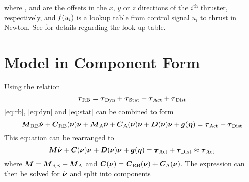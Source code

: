 where ,  and  are the offsets in the $x$, $y$ or $z$ directions of the $i^\text{th}$ thruster, respectively, and $\mathit{f}(u_{i})$ is a lookup table from control signal $u_i$ to thrust in Newton. See  for details regarding the look-up table.

\section{Model in Component Form}
Using the relation
\begin{equation}
\boldsymbol{\tau}_{\text{RB}} = \boldsymbol{\tau}_{\text{Dyn}} + \boldsymbol{\tau}_{\text{Stat}} + \boldsymbol{\tau}_{\text{Act}} + \boldsymbol{\tau}_{\text{Dist}}
\end{equation} \eqref{eq:rb}, \eqref{eq:dyn} and \eqref{eq:stat} can be combined to form
\begin{equation}
\boldsymbol{M}_{\text{RB}}\dot{\boldsymbol{\nu}} + \boldsymbol{C}_{\text{RB}}(\boldsymbol{\nu})\boldsymbol{\nu} + \boldsymbol{M}_{\text{A}} \dot{\boldsymbol{\nu}} +\boldsymbol{C}_{\text{A}}(\boldsymbol{\nu})\boldsymbol{\nu} + \boldsymbol{D}(\boldsymbol{\nu})\boldsymbol{\nu} + \boldsymbol{g}(\boldsymbol{\eta}) = \boldsymbol{\tau}_\text{{Act}} + \boldsymbol{\tau}_{\text{Dist}}
\end{equation}
This equation can be rearranged to
\begin{equation}
\boldsymbol{M} \dot{\boldsymbol{\nu}} + \boldsymbol{C}(\boldsymbol{\nu})\boldsymbol{\nu} + \boldsymbol{D}(\boldsymbol{\nu})\boldsymbol{\nu} + \boldsymbol{g}(\boldsymbol{\eta}) = \boldsymbol{\tau}_{\text{Act}} + \boldsymbol{\tau}_{\text{Dist}} \approx \boldsymbol{\tau}_{\text{Act}}
\end{equation}
where $\boldsymbol{M} = \boldsymbol{M}_{\text{RB}} + \boldsymbol{M}_{\text{A}}$ and $\boldsymbol{C}(\boldsymbol{\nu})=\boldsymbol{C}_{\text{RB}}(\boldsymbol{\nu})+\boldsymbol{C}_{\text{A}}(\boldsymbol{\nu})$.
The expression can then be solved for $\dot{\boldsymbol{\nu}}$ and split into components  
